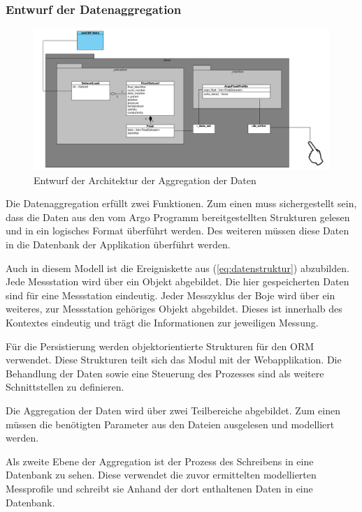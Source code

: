 \subsubsection{Entwurf der Datenaggregation}\label{sec:entwurfAggregation}
\begin{figure}[h!]
\centering
\includegraphics[width=\textwidth]{pix/grobentwurf_dataaggregation.png}
\caption{Entwurf der Architektur der Aggregation der Daten}
\label{fig:grobetwurf_architektur_datenaggregation}
\end{figure}

Die Datenaggregation erfüllt zwei Funktionen. Zum einen muss sichergestellt sein, dass die Daten aus den vom Argo Programm bereitgestellten Strukturen gelesen und in ein logisches Format überführt werden. Des weiteren müssen diese Daten in die Datenbank der Applikation überführt werden.

Auch in diesem Modell ist die Ereigniskette aus (\ref{eq:datenstruktur}) abzubilden. Jede Messstation wird über ein Objekt abgebildet. Die hier gespeicherten Daten sind für eine Messstation eindeutig. Jeder Messzyklus der Boje wird über ein weiteres, zur Messstation gehöriges Objekt abgebildet. Dieses ist innerhalb des Kontextes eindeutig und trägt die Informationen zur jeweiligen Messung.

Für die Persistierung  werden objektorientierte Strukturen für den ORM verwendet. Diese Strukturen teilt sich das Modul mit der Webapplikation. Die Behandlung der Daten sowie eine Steuerung des Prozesses sind als weitere Schnittstellen zu definieren. 

Die Aggregation der Daten wird über zwei Teilbereiche abgebildet. Zum einen müssen die benötigten Parameter aus den Dateien ausgelesen und modelliert werden. 

Als zweite Ebene der Aggregation ist der Prozess des Schreibens in eine Datenbank zu sehen. Diese verwendet die zuvor ermittelten modellierten Messprofile und schreibt sie Anhand der dort enthaltenen Daten in eine Datenbank.


